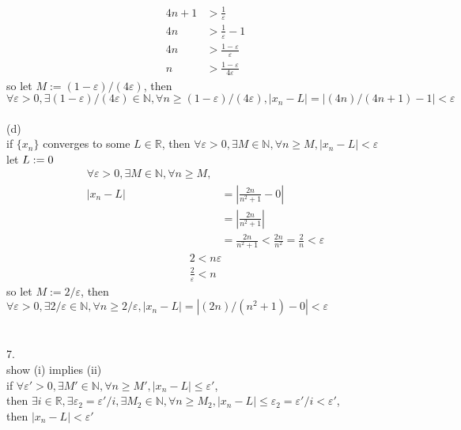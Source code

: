 \documentclass[12pt, border = 4pt, multi]{article} %
\begin{document}
\begin{align*}
4n + 1 &> \frac{1}{\varepsilon}\\
4n &> \frac{1}{\varepsilon} - 1\\
4n &> \frac{1 - \varepsilon}{\varepsilon}\\
n &> \frac{1 - \varepsilon}{4\varepsilon}
\end{align*}
so let $M := (1 - \varepsilon) / (4\varepsilon)$, then $\forall \varepsilon > 0, \exists (1 - \varepsilon) / (4\varepsilon) \in \mathbb{N}, \forall n \geq (1 - \varepsilon) / (4\varepsilon), |x_n - L| = |(4n) / (4n + 1) - 1| < \varepsilon$
\\
\\
(d)\\
if $\{x_n\}$ converges to some $L \in \mathbb{R}$, then $\forall \varepsilon > 0, \exists M \in \mathbb{N}, \forall n \geq M, |x_n - L| < \varepsilon$\\
let $L := 0\\$
\begin{align*}
\forall \varepsilon > 0, \exists M \in \mathbb{N}, \forall n \geq M,&\\
|x_n - L| &= \left|\frac{2n}{n ^ 2 + 1} - 0\right|\\
&= \left|\frac{2n}{n ^ 2 + 1}\right|\\
&= \frac{2n}{n ^ 2 + 1} < \frac{2n}{n ^ 2} = \frac{2}{n} < \varepsilon
\end{align*}
\begin{align*}
2 < n\varepsilon\\
\frac{2}{\varepsilon} < n
\end{align*}
so let $M := 2 / \varepsilon$, then $\forall \varepsilon > 0, \exists 2 / \varepsilon \in \mathbb{N}, \forall n \geq 2 / \varepsilon, |x_n - L| = |(2n) / (n ^ 2 + 1) - 0| < \varepsilon$\\
\\
\\
7.\\
show (i) implies (ii)\\
if $\forall \varepsilon' > 0, \exists M' \in \mathbb{N}, \forall n \geq M', |x_n - L| \leq \varepsilon'$,\\
then $\exists i \in \mathbb{R}, \exists \varepsilon_2 = \varepsilon' / i, \exists M_2 \in \mathbb{N}, \forall n \geq M_2, |x_n - L| \leq \varepsilon_2 = \varepsilon' / i < \varepsilon'$,\\
then $|x_n - L| < \varepsilon'$\\
\\
\\
\end{document}
